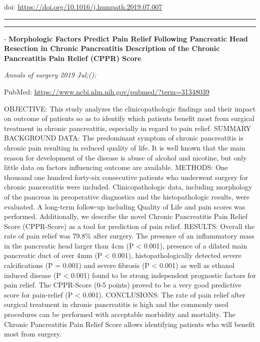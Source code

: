 \documentclass[]{article}
\begin{document}
doi: \url{https://doi.org/10.1016/j.humpath.2019.07.007}

{}

{}

\begin{center}\rule{0.5\linewidth}{\linethickness}\end{center}

\begin{center}\rule{0.5\linewidth}{\linethickness}\end{center}

 - \textbf{Morphologic Factors Predict Pain Relief Following Pancreatic
Head Resection in Chronic Pancreatitis Description of the Chronic
Pancreatitis Pain Relief (CPPR) Score}

\emph{Annals of surgery 2019 Jul;():}

PubMed: \url{https://www.ncbi.nlm.nih.gov/pubmed/?term=31348039}

OBJECTIVE: This study analyzes the clinicopathologic findings and their
impact on outcome of patients so as to identify which patients benefit
most from surgical treatment in chronic pancreatitis, especially in
regard to pain relief. SUMMARY BACKGROUND DATA: The predominant symptom
of chronic pancreatitis is chronic pain resulting in reduced quality of
life. It is well known that the main reason for development of the
disease is abuse of alcohol and nicotine, but only little data on
factors influencing outcome are available. METHODS: One thousand one
hundred forty-six consecutive patients who underwent surgery for chronic
pancreatitis were included. Clinicopathologic data, including morphology
of the pancreas in preoperative diagnostics and the histopathologic
results, were evaluated. A long-term follow-up including Quality of Life
and pain scores was performed. Additionally, we describe the novel
Chronic Pancreatitis Pain Relief Score (CPPR-Score) as a tool for
prediction of pain relief. RESULTS: Overall the rate of pain relief was
79.8\% after surgery. The presence of an inflammatory mass in the
pancreatic head larger than 4 cm (P \textless{} 0.001), presence of a
dilated main pancreatic duct of over 4 mm (P \textless{} 0.001),
histopathologically detected severe calcifications (P = 0.001) and
severe fibrosis (P \textless{} 0.001) as well as ethanol induced disease
(P \textless{} 0.001) found to be strong independent prognostic factors
for pain relief. The CPPR-Score (0-5 points) proved to be a very good
predictive score for pain-relief (P \textless{} 0.001). CONCLUSIONS: The
rate of pain relief after surgical treatment in chronic pancreatitis is
high and the commonly used procedures can be performed with acceptable
morbidity and mortality. The Chronic Pancreatitis Pain Relief Score
allows identifying patients who will benefit most from surgery.
\end{document}
